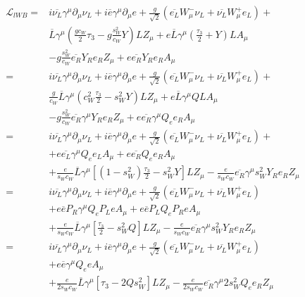 \begin{align}
\mathcal{L}_{l W B}=&i\overline{\nu_L}\gamma^\mu\partial_\mu\nu_L+i\overline{e}\gamma^\mu\partial_\mu e
+\frac{g}{\sqrt{2}}\left(\overline{e_L}W_\mu^-\nu_L+\overline{\nu_L}W_\mu^+e_L\right)+\nonumber\\
&\overline{L}\gamma^\mu\left(\frac{g c_W}{2}\tau_3 -g\frac{s^2_W}{c_W} Y \right)L Z_\mu
+e\overline{L}\gamma^\mu\left(\frac{\tau_3}{2} + Y \right) L A_\mu\nonumber\\
&-g \frac{s^2_W}{c_W}\overline{e_R}Y_R e_R Z_\mu+e \overline{e_R}Y_R e_R A_\mu\nonumber\\
=&i\overline{\nu_L}\gamma^\mu\partial_\mu\nu_L+i\overline{e}\gamma^\mu\partial_\mu e
+\frac{g}{\sqrt{2}}\left(\overline{e_L}W_\mu^-\nu_L+\overline{\nu_L}W_\mu^+e_L\right)+\nonumber\\
&\frac{g}{c_W}\overline{L}\gamma^\mu\left( c^2_W\frac{\tau_3}{2} - s^2_W Y \right)L Z_\mu
+e\overline{L}\gamma^\mu Q L A_\mu\nonumber\\
&-g \frac{s^2_W}{c_W}\overline{e_R}\gamma^\mu Y_R e_R Z_\mu+e \overline{e_R}\gamma^\mu Q_e e_R A_\mu\nonumber\\
=&i\overline{\nu_L}\gamma^\mu\partial_\mu\nu_L+i\overline{e}\gamma^\mu\partial_\mu e
+\frac{g}{\sqrt{2}}\left(\overline{e_L}W_\mu^-\nu_L+\overline{\nu_L}W_\mu^+e_L\right)+\nonumber\\
&+e\overline{e_L}\gamma^\mu Q_e e_L A_\mu+e \overline{e_R}Q_e e_R A_\mu\nonumber\\
&+\frac{e}{s_W c_W}\overline{L}\gamma^\mu\left[ (1-s^2_W)\frac{\tau_3}{2} -s^2_WY \right]L Z_\mu
-\frac{e}{s_W c_W}\overline{e_R}\gamma^\mu s^2_W Y_R e_R Z_\mu\nonumber\\
=&i\overline{\nu_L}\gamma^\mu\partial_\mu\nu_L+i\overline{e}\gamma^\mu\partial_\mu e
+\frac{g}{\sqrt{2}}\left(\overline{e_L}W_\mu^-\nu_L+\overline{\nu_L}W_\mu^+e_L\right)\nonumber\\
&+e\overline{e}P_R\gamma^\mu Q_e P_L e A_\mu+e \overline{e}P_L Q_e P_R e A_\mu\nonumber\\
&+\frac{e}{s_W c_W}\overline{L}\gamma^\mu\left[ \frac{\tau_3}{2}-s^2_W Q \right]L Z_\mu
-\frac{e}{s_W c_W}\overline{e_R}\gamma^\mu s^2_W Y_R e_R Z_\mu\nonumber\\
=&i\overline{\nu_L}\gamma^\mu\partial_\mu\nu_L+i\overline{e}\gamma^\mu\partial_\mu e
+\frac{g}{\sqrt{2}}\left(\overline{e_L}W_\mu^-\nu_L+\overline{\nu_L}W_\mu^+e_L\right)\nonumber\\
&+e\overline{e}\gamma^\mu Q_e e A_\mu\nonumber\\
&+\frac{e}{2s_W c_W}\overline{L}\gamma^\mu\left[\tau_3-2Q s^2_W\right]L Z_\mu
-\frac{e}{2s_W c_W}\overline{e_R}\gamma^\mu2s^2_W Q_e e_R Z_\mu
\end{align}
